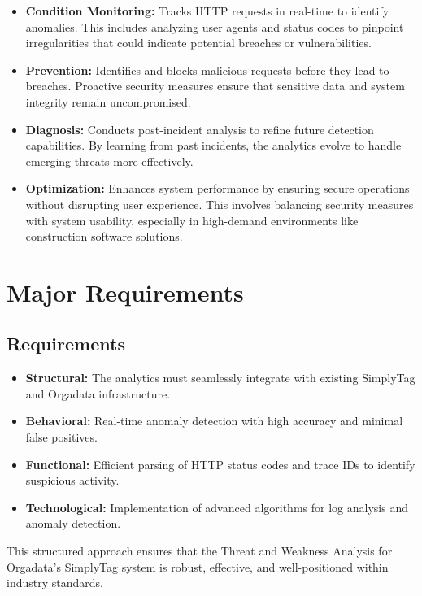 \begin{itemize}
	\item \textbf{Condition Monitoring:} Tracks HTTP requests in real-time to identify anomalies. This includes analyzing user agents and status codes to pinpoint irregularities that could indicate potential breaches or vulnerabilities.
	\item \textbf{Prevention:} Identifies and blocks malicious requests before they lead to breaches. Proactive security measures ensure that sensitive data and system integrity remain uncompromised.
	\item \textbf{Diagnosis:} Conducts post-incident analysis to refine future detection capabilities. By learning from past incidents, the analytics evolve to handle emerging threats more effectively.
	\item \textbf{Optimization:} Enhances system performance by ensuring secure operations without disrupting user experience. This involves balancing security measures with system usability, especially in high-demand environments like construction software solutions.
\end{itemize}

\chapter{Major Requirements}

\section{Requirements}

\begin{itemize}
	\item \textbf{Structural:} The analytics must seamlessly integrate with existing SimplyTag and Orgadata infrastructure.
	\item \textbf{Behavioral:} Real-time anomaly detection with high accuracy and minimal false positives.
	\item \textbf{Functional:} Efficient parsing of HTTP status codes and trace IDs to identify suspicious activity.
	\item \textbf{Technological:} Implementation of advanced algorithms for log analysis and anomaly detection.
\end{itemize}

This structured approach ensures that the Threat and Weakness Analysis for Orgadata’s SimplyTag system is robust, effective, and well-positioned within industry standards.

